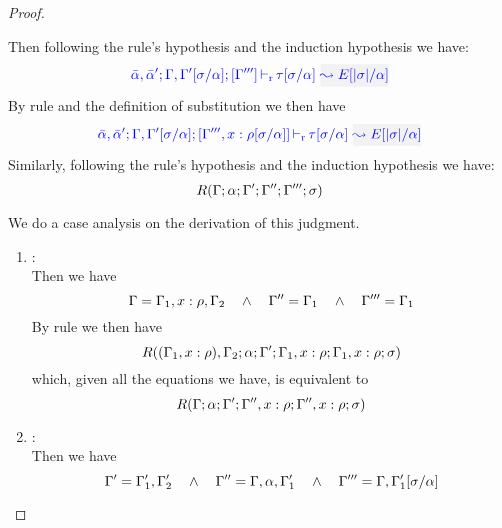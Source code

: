 \begin{proof}
\begin{description}
Then following the rule's hypothesis and the induction hypothesis we have:
\begin{equation*}
  \dlres{\bar{\alpha},\bar{\alpha}'}{\tenv,\tenv'[\suty/\alpha]}{\tenv'''}{\type[\suty/\alpha]}{E[|\suty|/\alpha]}
\end{equation*}
  By rule  and the definition of substitution we then have
\begin{equation*}
  \dlres{\bar{\alpha},\bar{\alpha}'}{\tenv,\tenv'[\suty/\alpha]}{\tenv''',\relation{x}{\rulet[\suty/\alpha]}}{\type[\suty/\alpha]}{E[|\suty|/\alpha]}
\end{equation*}
  Similarly, following the rule's hypothesis and the induction hypothesis we have:
\begin{equation*}
  R(\Gamma;\alpha;\Gamma';\Gamma'';\Gamma''';\sigma)
\end{equation*}

  We do a case analysis on the derivation of this judgment.
  \begin{enumerate}
  \item {}: \\ Then we have
\begin{equation*}
  \Gamma = \Gamma_1,x:\rho,\Gamma_2  \quad\wedge\quad \Gamma'' = \Gamma_1 \quad\wedge\quad \Gamma''' = \Gamma_1
\end{equation*}
       By rule  we then have
\begin{equation*}
R((\Gamma_1,x:\rho),\Gamma_2;\alpha;\Gamma';\Gamma_1,x:\rho;\Gamma_1,x:\rho;\sigma)
\end{equation*}
        which, given all the equations we have, is equivalent to
\begin{equation*}
R(\Gamma;\alpha;\Gamma';\Gamma'',x:\rho;\Gamma'',x:\rho;\sigma)
\end{equation*}

  \item {}: \\
   Then we have
\begin{equation*}
  \Gamma' = \Gamma_1',\Gamma_2' \quad\wedge\quad \Gamma'' = \Gamma,\alpha,\Gamma_1' \quad\wedge\quad
      \Gamma''' = \Gamma,\Gamma_1'[\sigma/\alpha]
\end{equation*}


\end{enumerate}
\end{description}
\end{proof}
